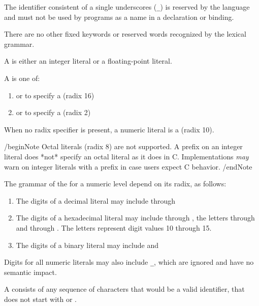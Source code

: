 The identifier consistent of a single underscores (\lstinline{_}) is reserved by the language and must not be used by programs as a name in a declaration or binding.

\begin{Note}
There are no other fixed keywords or reserved words recognized by the lexical grammar.
\end{Note}



A  is either an integer literal or a floating-point literal.

A  is one of:

\begin{enumerate}
    \item{ or  to specify a  (radix 16)}
    \item{ or  to specify a  (radix 2)}
\end{enumerate}
When no radix specifier is present, a numeric literal is a  (radix 10).

/begin{Note}
Octal literals (radix 8) are not supported.
A  prefix on an integer literal does *not* specify an octal literal as it does in C.
Implementations \emph{may} warn on integer literals with a  prefix in case users expect C behavior.
/end{Note}

The grammar of the  for a numeric level depend on its radix, as follows:

\begin{enumerate}
    \item{The digits of a decimal literal may include  through }
    \item{The digits of a hexadecimal literal may include  through , the letters  through  and  through . The letters represent digit values 10 through 15.}
    \item{The digits of a binary literal may include  and }
\end{enumerate}

Digits for all numeric literals may also include \lstinline{_}, which are ignored and have no semantic impact.

A  consists of any sequence of characters that would be a valid identifier, that does not start with  or .

